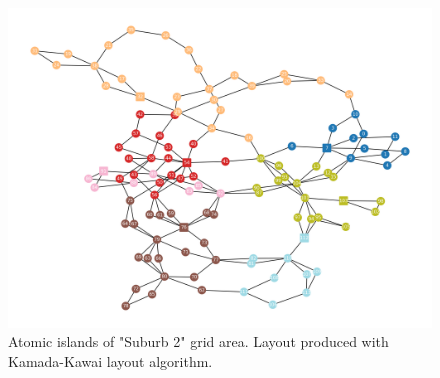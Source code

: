 \begin{figure}[H]
  \begin{center}
      \includegraphics[width=.8\linewidth]{img/switchstate_exploring/suburb2/topology_sss_patched.png}
  \end{center}
  \caption{
      Atomic islands of "Suburb 2" grid area. Layout produced with
      Kamada-Kawai layout algorithm\autocite{kamada_kawai}.
  }
  \label{fig:appendix:suburb2:topology_patched}
\end{figure}

